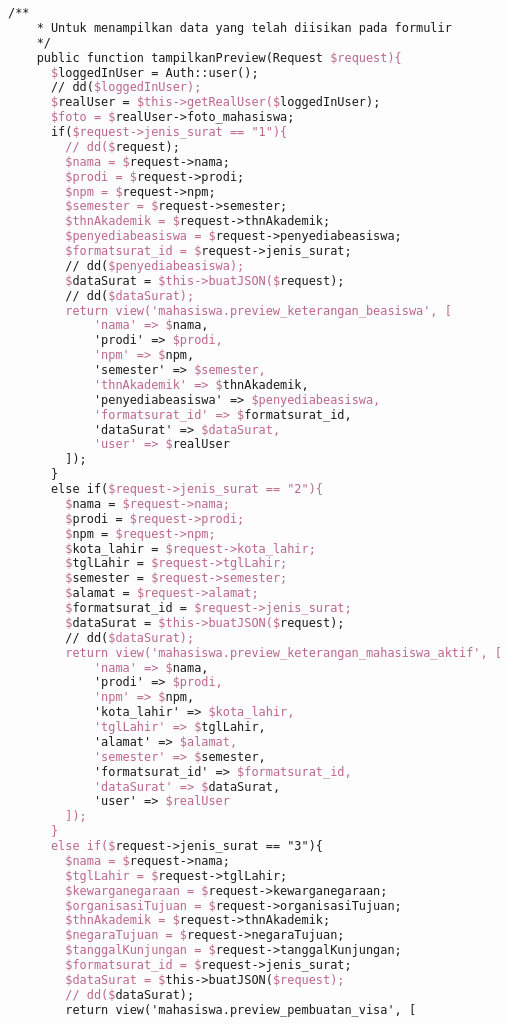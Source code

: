 \begin{lstlisting}[language=tex,basicstyle=\tiny,caption=PesanansuratController.php]
    /**
    * Untuk menampilkan data yang telah diisikan pada formulir
    */
    public function tampilkanPreview(Request $request){
      $loggedInUser = Auth::user();
      // dd($loggedInUser);
      $realUser = $this->getRealUser($loggedInUser);
      $foto = $realUser->foto_mahasiswa;
      if($request->jenis_surat == "1"){
        // dd($request);
        $nama = $request->nama;
        $prodi = $request->prodi;
        $npm = $request->npm;
        $semester = $request->semester;
        $thnAkademik = $request->thnAkademik;
        $penyediabeasiswa = $request->penyediabeasiswa;
        $formatsurat_id = $request->jenis_surat;
        // dd($penyediabeasiswa);
        $dataSurat = $this->buatJSON($request);
        // dd($dataSurat);
        return view('mahasiswa.preview_keterangan_beasiswa', [
            'nama' => $nama,
            'prodi' => $prodi,
            'npm' => $npm,
            'semester' => $semester,
            'thnAkademik' => $thnAkademik,
            'penyediabeasiswa' => $penyediabeasiswa,
            'formatsurat_id' => $formatsurat_id,
            'dataSurat' => $dataSurat,
            'user' => $realUser
        ]);
      }
      else if($request->jenis_surat == "2"){
        $nama = $request->nama;
        $prodi = $request->prodi;
        $npm = $request->npm;
        $kota_lahir = $request->kota_lahir;
        $tglLahir = $request->tglLahir;
        $semester = $request->semester;
        $alamat = $request->alamat;
        $formatsurat_id = $request->jenis_surat;
        $dataSurat = $this->buatJSON($request);
        // dd($dataSurat);
        return view('mahasiswa.preview_keterangan_mahasiswa_aktif', [
            'nama' => $nama,
            'prodi' => $prodi,
            'npm' => $npm,
            'kota_lahir' => $kota_lahir,
            'tglLahir' => $tglLahir,
            'alamat' => $alamat,
            'semester' => $semester,
            'formatsurat_id' => $formatsurat_id,
            'dataSurat' => $dataSurat,
            'user' => $realUser
        ]);
      }
      else if($request->jenis_surat == "3"){
        $nama = $request->nama;
        $tglLahir = $request->tglLahir;
        $kewarganegaraan = $request->kewarganegaraan;
        $organisasiTujuan = $request->organisasiTujuan;
        $thnAkademik = $request->thnAkademik;
        $negaraTujuan = $request->negaraTujuan;
        $tanggalKunjungan = $request->tanggalKunjungan;
        $formatsurat_id = $request->jenis_surat;
        $dataSurat = $this->buatJSON($request);
        // dd($dataSurat);
        return view('mahasiswa.preview_pembuatan_visa', [

\end{lstlisting}
